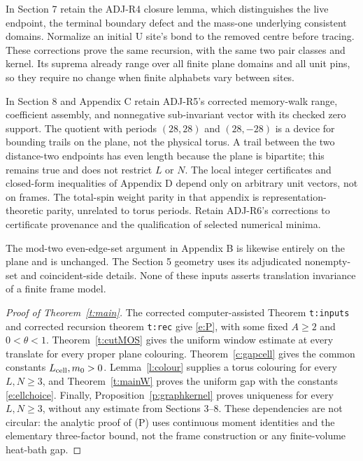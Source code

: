 \documentclass[11pt,reqno]{amsart}
\theoremstyle{definition}
\begin{document}
In Section 7 retain the ADJ-R4 closure lemma, which distinguishes the
live endpoint, the terminal boundary defect and the mass-one underlying
consistent domains. Normalize an initial $\mathrm U$ site's bond to
the removed centre before tracing. These corrections prove the same
recursion, with the same two pair classes and kernel. Its suprema
already range over all finite plane domains and all unit pins, so
they require no change when finite alphabets vary between sites.

In Section 8 and Appendix C retain ADJ-R5's corrected memory-walk
range, coefficient assembly, and nonnegative sub-invariant vector
with its checked zero support. The quotient with periods $(28,28)$
and $(28,-28)$ is a device for bounding trails on the plane, not the
physical torus. A trail between the two distance-two endpoints has
even length because the plane is bipartite; this remains true and
does not restrict $L$ or $N$. The local integer certificates and
closed-form inequalities of Appendix D depend only on arbitrary
unit vectors, not on frames. The total-spin weight parity in that
appendix is representation-theoretic parity, unrelated to torus
periods. Retain ADJ-R6's corrections to certificate provenance and
the qualification of selected numerical minima.

The mod-two even-edge-set argument in Appendix B is likewise entirely
on the plane and is unchanged. The Section 5 geometry uses its
adjudicated nonempty-set and coincident-side details. None of these
inputs asserts translation invariance of a finite frame model.

\begin{proof}[Proof of Theorem~\ref{t:main}]
The corrected computer-assisted Theorem \texttt{t:inputs} and corrected
recursion theorem \texttt{t:rec} give \eqref{e:P}, with some fixed
$A\ge2$ and $0<\theta<1$. Theorem~\ref{t:cutMOS} gives the uniform
window estimate at every translate for every proper plane colouring.
Theorem~\ref{c:gapcell} gives the common constants
$L_{\rm cell},m_0>0$. Lemma~\ref{l:colour} supplies a torus colouring
for every $L,N\ge3$, and Theorem~\ref{t:mainW} proves the uniform
gap with the constants \eqref{e:ellchoice}. Finally,
Proposition~\ref{p:graphkernel} proves uniqueness for every $L,N\ge3$,
without any estimate from Sections 3--8. These dependencies are not
circular: the analytic proof of (P) uses continuous moment identities
and the elementary three-factor bound, not the frame construction
or any finite-volume heat-bath gap.
\end{proof}
\end{document}
